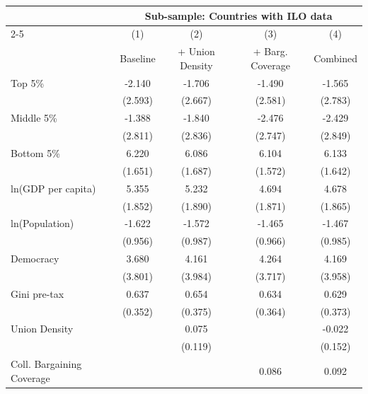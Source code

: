 \begin{tabular}{l*{4}{c}}
\toprule
                    &\multicolumn{4}{c}{Sub-sample: Countries with ILO data}\\\cmidrule(lr){2-5}
                    &\multicolumn{1}{c}{(1)}&\multicolumn{1}{c}{(2)}&\multicolumn{1}{c}{(3)}&\multicolumn{1}{c}{(4)}\\
                    &\multicolumn{1}{c}{Baseline}&\multicolumn{1}{c}{+ Union Density}&\multicolumn{1}{c}{+ Barg. Coverage}&\multicolumn{1}{c}{Combined}\\
\midrule
Top 5\%             &      -2.140&      -1.706&      -1.490&      -1.565\\
                    &     (2.593)&     (2.667)&     (2.581)&     (2.783)\\
\addlinespace
Middle 5\%          &      -1.388&      -1.840&      -2.476&      -2.429\\
                    &     (2.811)&     (2.836)&     (2.747)&     (2.849)\\
\addlinespace
Bottom 5\%          &       6.220&       6.086&       6.104&       6.133\\
                    &     (1.651)&     (1.687)&     (1.572)&     (1.642)\\
\addlinespace
ln(GDP per capita)  &       5.355&       5.232&       4.694&       4.678\\
                    &     (1.852)&     (1.890)&     (1.871)&     (1.865)\\
\addlinespace
ln(Population)      &      -1.622&      -1.572&      -1.465&      -1.467\\
                    &     (0.956)&     (0.987)&     (0.966)&     (0.985)\\
\addlinespace
Democracy           &       3.680&       4.161&       4.264&       4.169\\
                    &     (3.801)&     (3.984)&     (3.717)&     (3.958)\\
\addlinespace
Gini pre-tax        &       0.637&       0.654&       0.634&       0.629\\
                    &     (0.352)&     (0.375)&     (0.364)&     (0.373)\\
\addlinespace
Union Density       &            &       0.075&            &      -0.022\\
                    &            &     (0.119)&            &     (0.152)\\
\addlinespace
Coll. Bargaining Coverage&            &            &       0.086&       0.092\\

\end{tabular}
